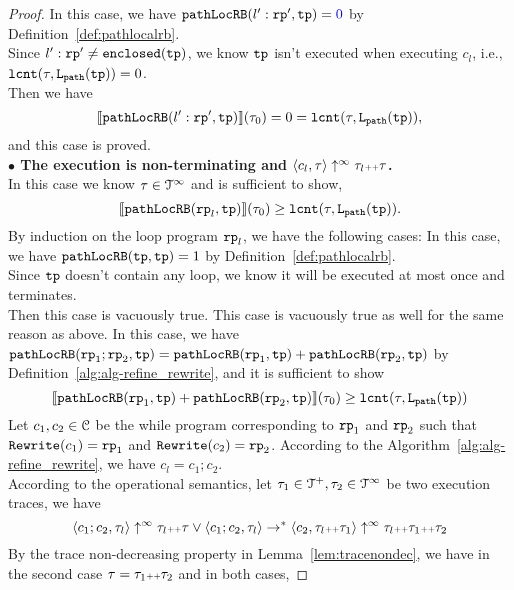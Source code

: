 \begin{proof}
  In this case, we have $\outinB(l': \rprog', \tpath) = \highlight{0} $ by Definition~\ref{def:pathlocalrb}.
  \\
  Since $l': \mathtt{rp}' \neq \mathtt{enclosed}(\mathtt{tp})$, we know $\mathtt{tp}$ isn't executed when executing $c_l$, i.e., $\mathtt{lcnt}(\mathtt{\tau}, \mathtt{L}_{\mathtt{path}}(\mathtt{tp})) = 0$.
  \\
  Then we have
  \[
    \llbracket \mathtt{pathLocRB}(l': \mathtt{rp}', \mathtt{tp}) \rrbracket(\mathtt{\tau}_0) = 0 = \mathtt{lcnt}(\mathtt{\tau}, \mathtt{L}_{\mathtt{path}}(\mathtt{tp})),
    \]
  and this case is proved.
\\
\textbf{$\bullet$ The execution is non-terminating and {$\langle {c_l}, \mathtt{\tau} \rangle \uparrow^{\infty} \mathtt{\tau}_l {\scriptscriptstyle ++} \mathtt{\tau}$}.} 
\\
 In this case we know $\mathtt{\tau} \in \mathcal{T}^{\infty}$ and is sufficient to show,
\[
  \llbracket \mathtt{pathLocRB}(\mathtt{rp}_l, \mathtt{tp}) \rrbracket(\mathtt{\tau}_0) \geq \mathtt{lcnt}(\mathtt{\tau}, \mathtt{L}_{\mathtt{path}}(\mathtt{tp})).
\]
By induction on the loop program $\mathtt{rp}_l$,
we have the following cases:
In this case, we have $\mathtt{pathLocRB}(\mathtt{tp}, \mathtt{tp}) = 1$ by Definition~\ref{def:pathlocalrb}. 
\\
Since $\mathtt{tp}$ doesn't contain any loop, we know it will be executed at most once and terminates.
\\
Then this case is vacuously true.
This case is vacuously true as well for the same reason as above.
In this case, we have $\mathtt{pathLocRB}(\mathtt{rp}_1;\mathtt{rp}_2, \mathtt{tp}) = \mathtt{pathLocRB}(\mathtt{rp}_1, \mathtt{tp}) + \mathtt{pathLocRB}(\mathtt{rp}_2, \mathtt{tp}) $ by Definition~\ref{alg:alg-refine_rewrite}, and
it is sufficient to show
\[
  \llbracket \mathtt{pathLocRB}(\mathtt{rp}_1, \mathtt{tp}) + \mathtt{pathLocRB}(\mathtt{rp}_2, \mathtt{tp}) \rrbracket(\mathtt{\tau}_0) \geq \mathtt{lcnt}(\mathtt{\tau}, \mathtt{L}_{\mathtt{path}}(\mathtt{tp})) 
\]
Let $c_1, c_2 \in \mathcal{C}$ be the while program corresponding to $\mathtt{rp}_1$ and $\mathtt{rp}_2$ such that $\mathtt{Rewrite}(c_1) = \mathtt{rp}_1$ and $\mathtt{Rewrite}(c_2) = \mathtt{rp}_2$.
According to the Algorithm~\ref{alg:alg-refine_rewrite}, we have $c_l = c_1; c_2$.
\\
According to the operational semantics, let $\mathtt{\tau}_1 \in \mathcal{T}^{+}, \mathtt{\tau}_2 \in \mathcal{T}^{\infty}$ be two execution traces, we have
\[
  \langle c_1; c_2, \mathtt{\tau}_l \rangle \uparrow^{\infty} \mathtt{\tau}_l {\scriptscriptstyle ++} \mathtt{\tau}
  \lor
  \langle c_1; c_2, \mathtt{\tau}_l \rangle \to^* \langle c_2, \mathtt{\tau}_l {\scriptscriptstyle ++} \mathtt{\tau}_1 \rangle \uparrow^{\infty} \mathtt{\tau}_l {\scriptscriptstyle ++} \mathtt{\tau}_1 {\scriptscriptstyle ++} \mathtt{\tau}_2
\]
By the trace non-decreasing property in Lemma~\ref{lem:tracenondec}, we have in the second case $\mathtt{\tau} = \mathtt{\tau}_1 {\scriptscriptstyle ++} \mathtt{\tau}_2$ and in both cases,

\end{proof}
